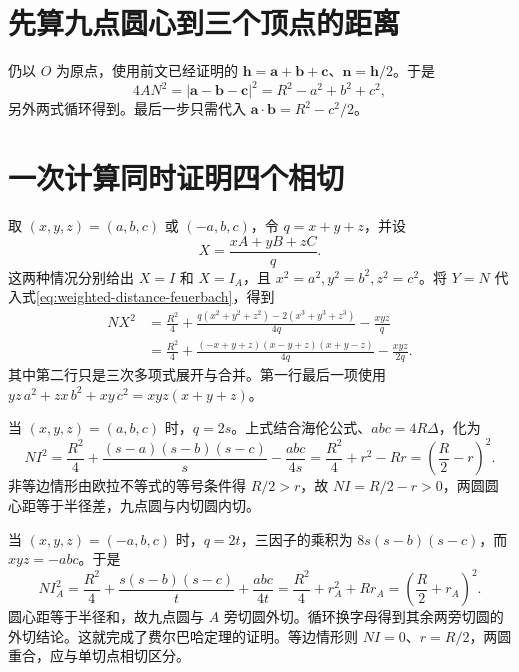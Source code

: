 \documentclass[lang=cn,12pt,fontset=none,a4paper,openany]{beautybook}
\begin{document}
\section{先算九点圆心到三个顶点的距离}
仍以 $O$ 为原点，使用前文已经证明的
$\mathbf h=\mathbf a+\mathbf b+\mathbf c$、$\mathbf n=\mathbf h/2$。于是
\[
 4AN^2=|\mathbf a-\mathbf b-\mathbf c|^2
 =R^2-a^2+b^2+c^2,
\]
另外两式循环得到。最后一步只需代入
$\mathbf a\cdot\mathbf b=R^2-c^2/2$。

\section{一次计算同时证明四个相切}
取 $(x,y,z)=(a,b,c)$ 或 $(-a,b,c)$，令 $q=x+y+z$，并设
\[
 X=\frac{xA+yB+zC}{q}.
\]
这两种情况分别给出 $X=I$ 和 $X=I_A$，且 $x^2=a^2,y^2=b^2,z^2=c^2$。将 $Y=N$ 代入式\eqref{eq:weighted-distance-feuerbach}，得到
\begin{align*}
 NX^2
 &=\frac{R^2}{4}
 +\frac{q(x^2+y^2+z^2)-2(x^3+y^3+z^3)}{4q}
 -\frac{xyz}{q}\\
 &=\frac{R^2}{4}
 +\frac{(-x+y+z)(x-y+z)(x+y-z)}{4q}
 -\frac{xyz}{2q}.
\end{align*}
其中第二行只是三次多项式展开与合并。第一行最后一项使用
$yz\,a^2+zx\,b^2+xy\,c^2=xyz(x+y+z)$。

当 $(x,y,z)=(a,b,c)$ 时，$q=2s$。上式结合海伦公式、$abc=4R\Delta$，化为
\[
 NI^2=\frac{R^2}{4}
 +\frac{(s-a)(s-b)(s-c)}{s}-\frac{abc}{4s}
 =\frac{R^2}{4}+r^2-Rr
 =\left(\frac R2-r\right)^2.
\]
非等边情形由欧拉不等式的等号条件得 $R/2>r$，故 $NI=R/2-r>0$，两圆圆心距等于半径差，九点圆与内切圆内切。

当 $(x,y,z)=(-a,b,c)$ 时，$q=2t$，三因子的乘积为 $8s(s-b)(s-c)$，而 $xyz=-abc$。于是
\[
 NI_A^2=\frac{R^2}{4}
 +\frac{s(s-b)(s-c)}{t}+\frac{abc}{4t}
 =\frac{R^2}{4}+r_A^2+Rr_A
 =\left(\frac R2+r_A\right)^2.
\]
圆心距等于半径和，故九点圆与 $A$ 旁切圆外切。循环换字母得到其余两旁切圆的外切结论。这就完成了费尔巴哈定理的证明。等边情形则 $NI=0$、$r=R/2$，两圆重合，应与单切点相切区分。
\end{document}
